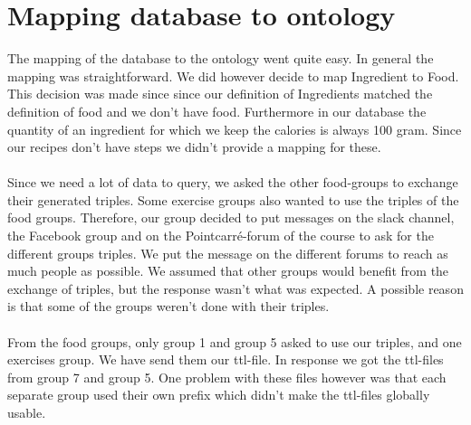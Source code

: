\section{Mapping database to ontology}
The mapping of the database to the ontology went quite easy. In general the mapping was straightforward. We did however decide to map Ingredient to Food. This decision was made since since our definition of Ingredients matched the definition of food and we don't have food. Furthermore in our database the quantity of an ingredient for which we keep the calories is always 100 gram. Since our recipes don't have steps we didn't provide a mapping for these. 
\\ \\
Since we need a lot of data to query, we asked the other food-groups to exchange their generated triples. Some exercise groups also wanted to use the triples of the food groups. Therefore, our group decided to put messages on the slack channel, the Facebook group and on the Pointcarré-forum of the course to ask for the different groups triples. We put the message on the different forums to reach as much people as possible. We assumed that other groups would benefit from the exchange of triples, but the response wasn't what was expected. A possible reason is that some of the groups weren't done with their triples.
\\ \\
From the food groups, only group 1 and group 5 asked to use our triples, and one exercises group. We have send them our ttl-file. In response we got the ttl-files from group 7 and group 5. One problem with these files however was that each separate group used their own prefix which didn't make the ttl-files globally usable. 

